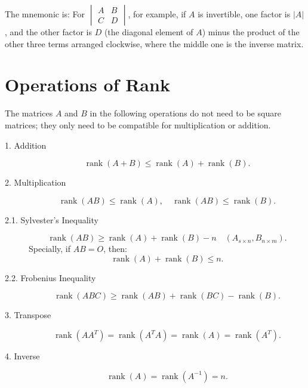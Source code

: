 \documentclass[11pt]{../../TexTemplate/elegantbook} %
\begin{document}
\begin{remark}
    The mnemonic is: 
    For \( \begin{vmatrix} A & B \\ C & D \end{vmatrix} \), for example, if \( A \) is invertible, 
    one factor is \( |A| \), and the other factor is \( D \) (the diagonal element of \( A \)) minus 
    the product of the other three terms arranged clockwise, where the middle one is the inverse matrix.
\end{remark}




\section{Operations of Rank}
\begin{proposition}
    The matrices \( A \) and \( B \) in the following operations do not need to be square matrices; 
    they only need to be compatible for multiplication or addition.
    \begin{description}
        \item [1. Addition]
        \[
        \operatorname{rank}(A + B) \leqslant \operatorname{rank}(A) + \operatorname{rank}(B).
        \]
        \item [2. Multiplication]
        \[
        \operatorname{rank}(AB) \leqslant \operatorname{rank}(A), \quad \operatorname{rank}(AB) \leqslant \operatorname{rank}(B).
        \]
        \item[2.1. Sylvester's Inequality]
        \[
        \operatorname{rank}(AB) \geqslant \operatorname{rank}(A) + \operatorname{rank}(B) - n \quad (A_{s \times n}, B_{n \times m}).
        \]
        Specially, if \( AB = O \), then:
        \[
        \operatorname{rank}(A) + \operatorname{rank}(B) \leqslant n.
        \]

        \item[2.2. Frobenius Inequality]
        \[
        \operatorname{rank}(ABC) \geqslant \operatorname{rank}(AB) + \operatorname{rank}(BC) - \operatorname{rank}(B).
        \]

        \item [3. Transpose]
        \[
        \operatorname{rank}(AA^T) = \operatorname{rank}(A^TA) = \operatorname{rank}(A) = \operatorname{rank}(A^T).
        \]

        \item [4. Inverse]
        \[
        \operatorname{rank}(A) = \operatorname{rank}(A^{-1}) = n.
        \]
    \end{description}
\end{proposition}
\end{document}
